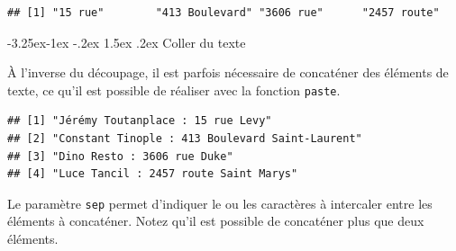 \documentclass[
  11pt,
  french,
]{book}
\makeatletter
\newenvironment{Shaded}{\begin{snugshade}}{\end{snugshade}}
\newcommand{\DataTypeTok}[1]{\textcolor[rgb]{0.13,0.29,0.53}{#1}}
\newcommand{\DecValTok}[1]{\textcolor[rgb]{0.00,0.00,0.81}{#1}}
\newcommand{\KeywordTok}[1]{\textcolor[rgb]{0.13,0.29,0.53}{\textbf{#1}}}
\newcommand{\NormalTok}[1]{#1}
\newcommand{\OperatorTok}[1]{\textcolor[rgb]{0.81,0.36,0.00}{\textbf{#1}}}
\newcommand{\StringTok}[1]{\textcolor[rgb]{0.31,0.60,0.02}{#1}}
\newenvironment{kframe}{%
\medskip{}
\setlength{\fboxsep}{.8em}
 \def\at@end@of@kframe{}%
 \ifinner\ifhmode%
  \def\at@end@of@kframe{\end{minipage}}%
  \begin{minipage}{\columnwidth}%
 \fi\fi%
 \def\FrameCommand##1{\hskip\@totalleftmargin \hskip-\fboxsep
 \colorbox{shadecolor}{##1}\hskip-\fboxsep
     \hskip-\linewidth \hskip-\@totalleftmargin \hskip\columnwidth}%
 \MakeFramed {\advance\hsize-\width
   \@totalleftmargin\z@ \linewidth\hsize
   \@setminipage}}%
 {\par\unskip\endMakeFramed%
 \at@end@of@kframe}
\renewenvironment{Shaded}{\begin{kframe}}{\end{kframe}}
\renewcommand\paragraph{\@startsection{paragraph}{4}{\z@}%
   {-3.25ex\@plus -1ex \@minus -.2ex}%
   {1.5ex \@plus .2ex}%
   {\normalfont\normalsize\bfseries}}
\makeatother
\begin{document}
\begin{verbatim}
## [1] "15 rue"        "413 Boulevard" "3606 rue"      "2457 route"
\end{verbatim}

\hypertarget{sect014254}{%
\paragraph{Coller du texte}\label{sect014254}}

À l'inverse du découpage, il est parfois nécessaire de concaténer des éléments de texte, ce qu'il est possible de réaliser avec la fonction \texttt{paste}.

\begin{Shaded}
\end{Shaded}

\begin{verbatim}
## [1] "Jérémy Toutanplace : 15 rue Levy"              
## [2] "Constant Tinople : 413 Boulevard Saint-Laurent"
## [3] "Dino Resto : 3606 rue Duke"                    
## [4] "Luce Tancil : 2457 route Saint Marys"
\end{verbatim}

Le paramètre \texttt{sep} permet d'indiquer le ou les caractères à intercaler entre les éléments à concaténer. Notez qu'il est possible de concaténer plus que deux éléments.

\begin{Shaded}
\end{Shaded}
\end{document}
